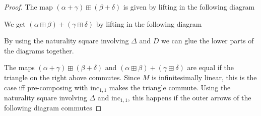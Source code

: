 \begin{proof}
  The map $(\alpha + \gamma) \boxplus (\beta + \delta)$ is given by lifting in the following diagram
  \begin{center}
  \end{center}
  We get $(\alpha \boxplus \beta) + (\gamma \boxplus \delta)$ by lifting in the following diagram
  \begin{center}
  \end{center}
  By using the naturality square involving $\Delta$ and $D$ we can glue the lower parts of the diagrams together.
  \begin{center}
  \end{center}
  The maps $(\alpha + \gamma) \boxplus (\beta + \delta)$ and $(\alpha \boxplus \beta) + (\gamma \boxplus \delta)$ are equal if the triangle on the right above commutes.
  Since $M$ is infinitesimally linear, this is the case iff pre-composing with $\mathrm{inc}_{1,1}$ makes the triangle commute.
  Using the naturality square involving $\Delta$ and $\mathrm{inc}_{1,1}$, this happens if the outer arrows of the following diagram commutes

\end{proof}
